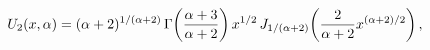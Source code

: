 \[U_{2}(x,\alpha)=(\alpha+2)^{1/(\alpha+2)}\*\mathop{\Gamma\/}\nolimits\!\left(%
\frac{\alpha+3}{\alpha+2}\right)x^{1/2}\mathop{J_{1/(\alpha+2)}\/}\nolimits\!%
\left(\frac{2}{\alpha+2}x^{(\alpha+2)/2}\right),\]